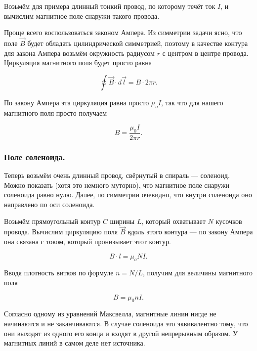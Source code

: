 \documentclass[11pt,a4paper]{article}
\numberwithin{equation}{section}
\begin{document}
Возьмём для примера длинный тонкий провод, по которому течёт ток $I$,
и вычислим магнитное поле снаружи такого провода.

Проще всего воспользоваться законом Ампера. Из симметрии задачи ясно,
что поле $\vec{B}$ будет обладать цилиндрической симметрией, поэтому в
качестве контура для закона Ампера возьмём окружность радиусом $r$ с
центром в центре провода. Циркуляция магнитного поля будет просто
равна

\begin{equation}
  \label{eq:mfield_thin_current_1}
  \oint \vec{B} \cdot d \vec{l} = B \cdot 2 \pi r.
\end{equation}

По закону Ампера эта циркуляция равна просто $\mu_o I$, так что для
нашего магнитного поля просто получаем

\begin{equation}
  \label{eq:mfield_thin_current_2}
  B =  \frac{\mu_0 I}{2\pi r}.
\end{equation}

\subsubsection{Поле соленоида.}
\label{sec:mfield_solenoid}

Теперь возьмём очень длинный провод, свёрнутый в спираль ---
соленоид. Можно показать (хотя это немного муторно), что магнитное
поле снаружи соленоида равно нулю. Далее, по симметрии очевидно, что
внутри соленоида оно направлено по оси соленоида. 

Возьмём прямоугольный контур $C$ ширины $L$, который охватывает $N$
кусочков провода. Вычислим циркуляцию поля $\vec{B}$ вдоль этого
контура --- по закону Ампера она связана с током, который пронизывает
этот контур. 

\begin{equation}
  \label{eq:der_mfield_solenoid}
  B \cdot l = \mu_o N I.
\end{equation}

Вводя плотность витков по формуле $n = N/L$, получим для величины
магнитного поля

\begin{equation}
  \label{eq:mfield_solenoid}
  B = \mu_0 n I.
\end{equation}

Согласно одному из уравнений Максвелла, магнитные линии нигде не
начинаются и не заканчиваются. В случае соленоида это эквивалентно
тому, что они выходят из одного его конца и входят в другой
непрерывным образом. У магнитных линий в самом деле нет источника. 
\end{document}

